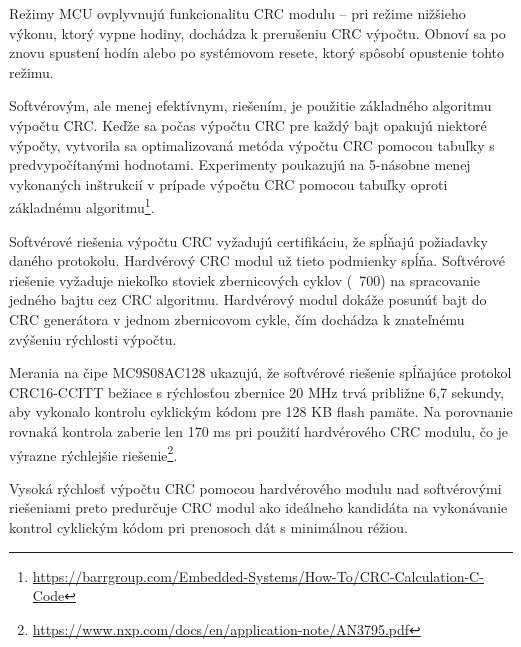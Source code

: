 \documentclass[10pt,a4paper]{article}
\begin{document}
	Režimy MCU ovplyvnujú funkcionalitu CRC modulu -- pri režime nižšieho výkonu, ktorý vypne hodiny, dochádza k prerušeniu CRC výpočtu. Obnoví sa po znovu spustení hodín alebo po systémovom resete, ktorý spôsobí opustenie tohto režimu.
	
	Softvérovým, ale menej efektívnym, riešením, je použitie základného algoritmu výpočtu CRC. Keďže sa počas výpočtu CRC pre každý bajt opakujú niektoré výpočty, vytvorila sa optimalizovaná metóda výpočtu CRC pomocou tabuľky s predvypočítanými hodnotami. Experimenty poukazujú na 5-násobne menej vykonaných inštrukcií v prípade výpočtu CRC pomocou tabuľky oproti základnému algoritmu\footnote{\url{https://barrgroup.com/Embedded-Systems/How-To/CRC-Calculation-C-Code}}.
	
	Softvérové riešenia výpočtu CRC vyžadujú certifikáciu, že spĺňajú požiadavky daného protokolu. Hardvérový CRC modul už tieto podmienky spĺňa. Softvérové riešenie vyžaduje niekoľko stoviek zbernicových cyklov (~700) na spracovanie jedného bajtu cez CRC algoritmu. Hardvérový modul dokáže posunúť bajt do CRC generátora v jednom zbernicovom cykle, čím dochádza k znateľnému zvýšeniu rýchlosti výpočtu. 
	
	Merania na čipe MC9S08AC128 ukazujú, že softvérové riešenie spĺňajúce protokol
	CRC16-CCITT bežiace s rýchlosťou zbernice 20 MHz trvá približne 6,7 sekundy, aby vykonalo kontrolu cyklickým kódom pre 128 KB flash pamäte. Na porovnanie rovnaká kontrola zaberie len 170 ms pri použití hardvérového CRC modulu, čo je výrazne rýchlejšie riešenie\footnote{\url{https://www.nxp.com/docs/en/application-note/AN3795.pdf}}.
	
	Vysoká rýchlosť výpočtu CRC pomocou hardvérového modulu nad softvérovými riešeniami preto predurčuje CRC modul ako ideálneho kandidáta na vykonávanie kontrol cyklickým kódom pri prenosoch dát s minimálnou réžiou.
\end{document}
